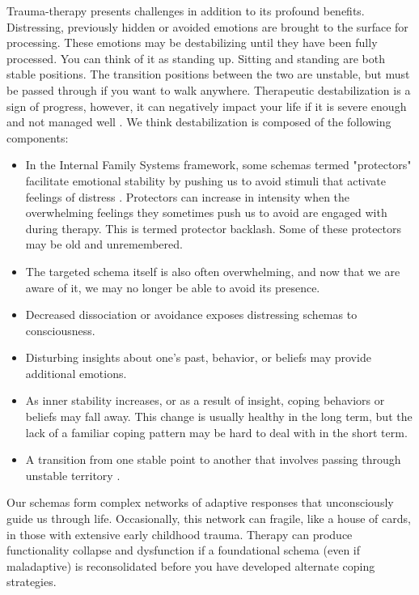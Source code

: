 \documentclass[12pt,letterpaper]{article}
\begin{document}
\label{def:destabilization}
Trauma-therapy presents challenges in addition to its profound benefits. Distressing, previously hidden or avoided emotions are brought to the surface for processing. These emotions may be destabilizing until they have been fully processed. You can think of it as standing up. Sitting and standing are both stable positions. The transition positions between the two are unstable, but must be passed through if you want to walk anywhere. Therapeutic destabilization is a sign of progress, however, it can negatively impact your life if it is severe enough and not managed well \cite{olthofDestabilization}. We think destabilization is composed of the following components:
\begin{itemize}
    \item In the Internal Family Systems framework, some schemas termed "protectors" facilitate emotional stability by pushing us to avoid stimuli that activate feelings of distress \cite{schwartz2019internal}. Protectors can increase in intensity when the overwhelming feelings they sometimes push us to avoid are engaged with during therapy. This is termed protector backlash. Some of these protectors may be old and unremembered.
    \item The targeted schema itself is also often overwhelming, and now that we are aware of it, we may no longer be able to avoid its presence.
    \item Decreased dissociation or avoidance exposes distressing schemas to consciousness.
    \item Disturbing insights about one's past, behavior, or beliefs may provide additional emotions.
    \item As inner stability increases, or as a result of insight, coping behaviors or beliefs may fall away. This change is usually healthy in the long term, but the lack of a familiar coping pattern may be hard to deal with in the short term.
    \item A transition from one stable point to another that involves passing through unstable territory \cite{olthofDestabilization}.
\end{itemize}
Our schemas form complex networks of adaptive responses that unconsciously guide us through life. Occasionally, this network can fragile, like a house of cards, in those with extensive early childhood trauma. Therapy can produce functionality collapse and dysfunction if a foundational schema (even if maladaptive) is reconsolidated before you have developed alternate coping strategies.
\end{document}

